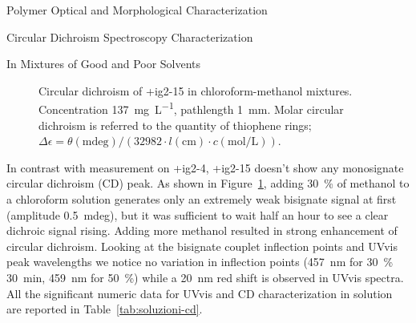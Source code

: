 \begin{section}{Polymer Optical and Morphological Characterization}
\begin{subsection}{Circular Dichroism Spectroscopy Characterization}
\begin{subsubsection}{In Mixtures of Good and Poor Solvents}
\begin{figure}[tbp]%
 \caption[Circular dichroism of \cmpd+{ig2-15} in chloro\-form-methanol mixtures.]{Circular dichroism of \cmpd+{ig2-15} in chloro\-form-methanol mixtures. Concentration \SI{137}{\mg\per\liter}, pathlength \SI{1}{\mm}. Molar circular dichroism is referred to the quantity of thio\-phene rings; $\Delta\epsilon = \theta (\mathrm{mdeg}) / (32982 \cdot l (\mathrm{cm}) \cdot c (\mathrm{mol/L}))$.}
\label{fig:ig2-15-cd-meoh}
\end{figure}

In contrast with measurement on \cmpd+{ig2-4}, \cmpd+{ig2-15} doesn't show any monosignate circular dichroism (CD) peak. As shown in Figure~\ref{fig:ig2-15-cd-meoh}, adding 30~\% of methanol to a chloroform solution generates only an extremely weak bisignate signal at first (amplitude \SI{0.5}{mdeg}), but it was sufficient to wait half an hour to see a clear dichroic signal rising. Adding more methanol resulted in strong enhancement of circular dichroism. 
Looking at the bisignate couplet inflection points and \gls{UVvis} peak wavelengths 
we notice no variation in inflection points (\SI{457}{\nm} for  30~\% \SI{30}{\minute}, \SI{459}{\nm} for  50~\%) while a \SI{20}{\nm} red shift is observed in \gls{UVvis} spectra. 
All the significant numeric data for \gls{UVvis} and \gls{CD} characterization in solution are reported in Table~\ref{tab:soluzioni-cd}.


\end{subsubsection}
\end{subsection}
\end{section}

